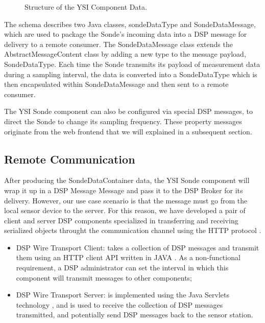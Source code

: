\documentclass[conference]{IEEEtran}
\begin{document}
\begin{figure}[!htb]
\centering
{}
\caption{\label{FIG_DSP_YSI_DATA} Structure of the YSI Component Data.}
\end{figure}

The schema describes two Java classes, sondeDataType and SondeDataMessage, 
which are used to package the Sonde's incoming data into a DSP message for delivery 
to a remote consumer.  The SondeDataMessage class extends the AbstractMessageContent 
class by adding a new type to the message payload, SondeDataType.  Each time the Sonde
transmits its payload of measurement data during a sampling interval, the data is converted 
into a SondeDataType which is then encapsulated within SondeDataMessage and then sent 
to a remote consumer.

The YSI Sonde component can also be configured via special DSP messages, to direct the 
Sonde to change its sampling frequency.  These property messages originate from the web 
frontend that we will explained in a subsequent section.

\subsection{Remote Communication}

After producing the SondeDataContainer data, the YSI Sonde component will wrap
it up in a DSP Message Message and pass it to the DSP Broker for its delivery.
However, our use case scenario is that the message must go from the local
sensor device to the server. For this reason, we have developed a pair of
client and server DSP components specialized in transferring and receiving 
serialized objects throught the communication channel using the HTTP protocol
\cite{RFC2068}.

\begin{itemize}
  \item DSP Wire Transport Client: takes a collection of DSP messages and
  transmit them using an HTTP client API written in JAVA \cite{http-client}. As
  a non-functional requirement, a DSP administrator can set the interval in
  which this component will transmit messages to other components;
  \item DSP Wire Transport Server: is implemented using the Java Servlets
  technology \cite{java-servlets}, and is used to receive the collection of DSP
  messages transmitted, and potentially send DSP messages back to the sensor
  station. 
\end{itemize}
\end{document}

